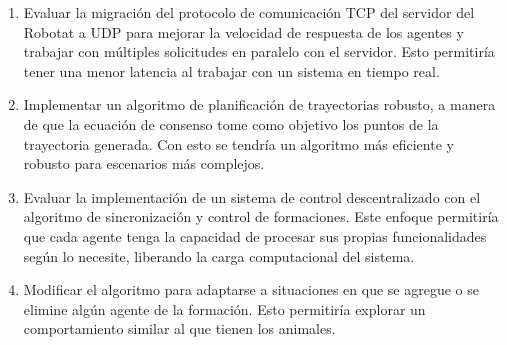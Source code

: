 \begin{enumerate}
	\item Evaluar la migración del protocolo de comunicación TCP del servidor del Robotat a UDP para mejorar la velocidad de respuesta de los agentes y trabajar con múltiples solicitudes en paralelo con el servidor. Esto permitiría tener una menor latencia al trabajar con un sistema en tiempo real.
	\item Implementar un algoritmo de planificación de trayectorias robusto, a manera de que la ecuación de consenso tome como objetivo los puntos de la trayectoria generada. Con esto se tendría un algoritmo más eficiente y robusto para escenarios más complejos.
	\item Evaluar la implementación de un sistema de control descentralizado con el algoritmo de sincronización y control de formaciones. Este enfoque permitiría que cada agente tenga la capacidad de procesar sus propias funcionalidades según lo necesite, liberando la carga computacional del sistema.
	\item Modificar el algoritmo para adaptarse a situaciones en que se agregue o se elimine algún agente de la formación. Esto permitiría explorar un comportamiento similar al que tienen los animales.
\end{enumerate}